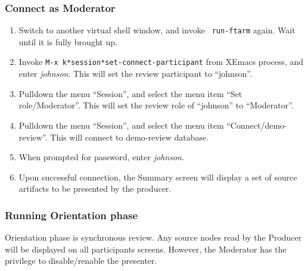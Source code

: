 \subsubsection{Connect as Moderator}
\begin{enumerate}
\item Switch to another virtual shell window, and invoke {\tt
run-ftarm} again. Wait until it is fully brought up. 
\item Invoke {\tt M-x k*session*set-connect-participant} from XEmacs
process, and enter {\it johnson}. This will set the review participant
to ``johnson''.
\item Pulldown the menu ``Session'', and select the menu item ``Set
role/Moderator''. This will set the review role of ``johnson'' to
``Moderator''. 
\item Pulldown the menu ``Session'', and select the menu item
``Connect/demo-review''. This will connect to demo-review database.
\item When prompted for password, enter {\it johnson}.
\item Upon successful connection, the Summary screen will display a
set of source artifacts to be presented by the producer.
\end{enumerate}


\subsubsection{Running Orientation phase}
Orientation phase is synchronous review. Any source nodes read by the
Producer will be displayed on all participants screens. However, the
Moderator has the privilege to disable/renable the presenter.

